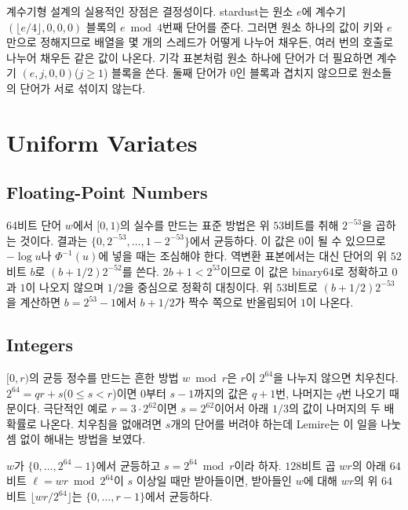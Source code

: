 계수기형 설계의 실용적인 장점은 결정성이다. stardust는 원소 $e$에 계수기 $(\lfloor e/4\rfloor,0,0,0)$ 블록의 $e\bmod4$번째 단어를 준다. 그러면 원소 하나의 값이 키와 $e$만으로 정해지므로 배열을 몇 개의 스레드가 어떻게 나누어 채우든, 여러 번의 호출로 나누어 채우든 같은 값이 나온다. 기각 표본처럼 원소 하나에 단어가 더 필요하면 계수기 $(e,j,0,0)$($j\ge1$) 블록을 쓴다. 둘째 단어가 $0$인 블록과 겹치지 않으므로 원소들의 단어가 서로 섞이지 않는다.

\section{Uniform Variates}
\label{sec:uniform-values}

\subsection{Floating-Point Numbers}

64비트 단어 $w$에서 $[0,1)$의 실수를 만드는 표준 방법은 위 $53$비트를 취해 $2^{-53}$을 곱하는 것이다. 결과는 $\{0,2^{-53},\dots,1-2^{-53}\}$에서 균등하다. 이 값은 $0$이 될 수 있으므로 $-\log u$나 $\Phi^{-1}(u)$에 넣을 때는 조심해야 한다. 역변환 표본에서는 대신 단어의 위 $52$비트 $b$로 $(b+1/2)2^{-52}$를 쓴다. $2b+1<2^{53}$이므로 이 값은 binary64로 정확하고 $0$과 $1$이 나오지 않으며 $1/2$을 중심으로 정확히 대칭이다. 위 $53$비트로 $(b+1/2)2^{-53}$을 계산하면 $b=2^{53}-1$에서 $b+1/2$가 짝수 쪽으로 반올림되어 $1$이 나온다.

\subsection{Integers}

$[0,r)$의 균등 정수를 만드는 흔한 방법 $w\bmod r$은 $r$이 $2^{64}$을 나누지 않으면 치우친다. $2^{64}=qr+s$($0\le s<r$)이면 $0$부터 $s-1$까지의 값은 $q+1$번, 나머지는 $q$번 나오기 때문이다. 극단적인 예로 $r=3\cdot2^{62}$이면 $s=2^{62}$이어서 아래 $1/3$의 값이 나머지의 두 배 확률로 나온다. 치우침을 없애려면 $s$개의 단어를 버려야 하는데 Lemire는 이 일을 나눗셈 없이 해내는 방법을 보였다\cite{lemire2019interval}.

\begin{proposition}[Lemire]
\label{prop:lemire}
$w$가 $\{0,\dots,2^{64}-1\}$에서 균등하고 $s=2^{64}\bmod r$이라 하자. $128$비트 곱 $wr$의 아래 $64$비트 $\ell=wr\bmod2^{64}$이 $s$ 이상일 때만 받아들이면, 받아들인 $w$에 대해 $wr$의 위 $64$비트 $\lfloor wr/2^{64}\rfloor$는 $\{0,\dots,r-1\}$에서 균등하다.
\end{proposition}

